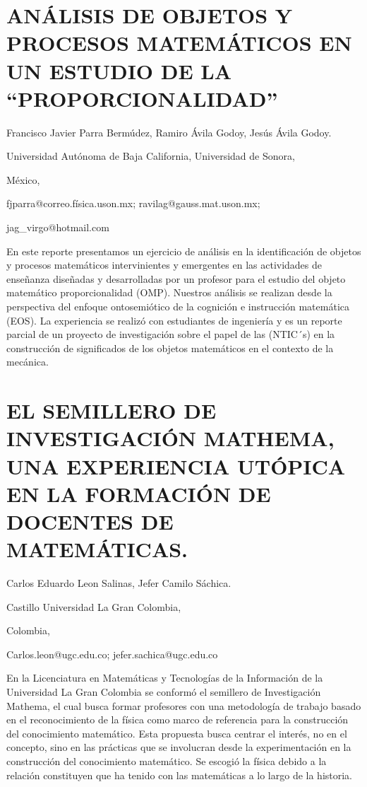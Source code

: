 \section{ANÁLISIS DE OBJETOS Y PROCESOS MATEMÁTICOS EN UN ESTUDIO DE LA “PROPORCIONALIDAD”}

\begin{datos}

Francisco Javier Parra Bermúdez, Ramiro Ávila Godoy, Jesús Ávila Godoy.

Universidad Autónoma de Baja California, Universidad de Sonora, 

México,

fjparra@correo.física.uson.mx; ravilag@gauss.mat.uson.mx;

jag\_virgo@hotmail.com 

\end{datos}

En este reporte presentamos un ejercicio de análisis en la identificación
de objetos y procesos matemáticos intervinientes y emergentes en las
actividades de enseñanza diseñadas y desarrolladas por un profesor
para el estudio del objeto matemático proporcionalidad (OMP). Nuestros
análisis se realizan desde la perspectiva del enfoque ontosemiótico
de la cognición e instrucción matemática (EOS). La experiencia se
realizó con estudiantes de ingeniería y es un reporte parcial de un
proyecto de investigación sobre el papel de las (NTIC´s) en la construcción
de significados de los objetos matemáticos en el contexto de la mecánica.


\section{EL SEMILLERO DE INVESTIGACIÓN MATHEMA, UNA EXPERIENCIA UTÓPICA EN
LA FORMACIÓN DE DOCENTES DE MATEMÁTICAS.}

\begin{datos}

Carlos Eduardo Leon Salinas, Jefer Camilo Sáchica.

Castillo Universidad La Gran Colombia, 

Colombia,

Carlos.leon@ugc.edu.co; jefer.sachica@ugc.edu.co 

\end{datos}

En la Licenciatura en Matemáticas y Tecnologías de la Información
de la Universidad La Gran Colombia se conformó el semillero de Investigación
Mathema, el cual busca formar profesores con una metodología de trabajo
basado en el reconocimiento de la física como marco de referencia
para la construcción del conocimiento matemático. Esta propuesta busca
centrar el interés, no en el concepto, sino en las prácticas que se
involucran desde la experimentación en la construcción del conocimiento
matemático. Se escogió la física debido a la relación constituyen
que ha tenido con las matemáticas a lo largo de la historia.


